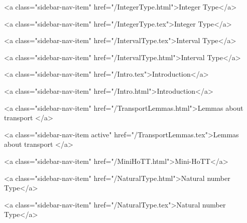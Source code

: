       
        
          <a class="sidebar-nav-item" href="/IntegerType.html">Integer Type</a>
        
      
    
      
        
          <a class="sidebar-nav-item" href="/IntegerType.tex">Integer Type</a>
        
      
    
      
        
          <a class="sidebar-nav-item" href="/IntervalType.tex">Interval Type</a>
        
      
    
      
        
          <a class="sidebar-nav-item" href="/IntervalType.html">Interval Type</a>
        
      
    
      
        
          <a class="sidebar-nav-item" href="/Intro.tex">Introduction</a>
        
      
    
      
        
          <a class="sidebar-nav-item" href="/Intro.html">Introduction</a>
        
      
    
      
        
          <a class="sidebar-nav-item" href="/TransportLemmas.html">Lemmas about transport </a>
        
      
    
      
        
          <a class="sidebar-nav-item active" href="/TransportLemmas.tex">Lemmas about transport </a>
        
      
    
      
        
          <a class="sidebar-nav-item" href="/MiniHoTT.html">Mini-HoTT</a>
        
      
    
      
        
          <a class="sidebar-nav-item" href="/NaturalType.html">Natural number Type</a>
        
      
    
      
        
          <a class="sidebar-nav-item" href="/NaturalType.tex">Natural number Type</a>
        
      
    
